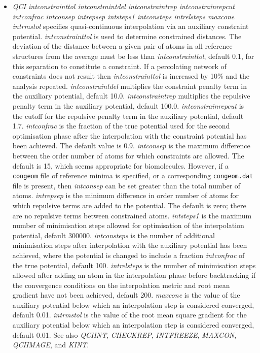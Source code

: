 \documentclass[12pt,a4paper,dvips]{article}
\begin{document}
\begin{itemize}
\item{\it QCI intconstrainttol intconstraintdel intconstraintrep intconstrainrepcut
intconfrac intconsep intrepsep intsteps1 intconsteps intrelsteps maxcone intrmstol\/}
specifies quasi-continuous interpolation via an auxiliary constraint potential.
{\it intconstrainttol\/} is used to determine constrained distances. The deviation
of the distance between a given pair of atoms
in all reference structures from the average must be less than
{\it intconstrainttol\/}, default 0.1, for this separation to constitute a constraint.
If a percolating network of constraints does not result then {\it intconstrainttol\/}
is increased by 10\% and the analysis repeated.
{\it intconstraintdel\/} multiplies the constraint penalty term in the auxiliary potential,
default 10.0.
{\it intconstraintrep\/} multiplies the repulsive penalty term in the auxiliary potential,
default 100.0.
{\it intconstrainrepcut\/} is the cutoff for the repulsive penalty term in the auxiliary potential,
default 1.7.
{\it intconfrac\/} is the fraction of the true potential used for the second optimisation
phase after the interpolation with the constraint potential has been achieved. The
default value is 0.9.
{\it intconsep\/} is the maximum difference between the order number of atoms for
which constraints are allowed. The default is 15, which seems appropriate for
biomolecules. However, if a {\tt congeom} file of reference minima is specified, or
a corresponding {\tt congeom.dat} file is present, then {\it intconsep\/} can be set
greater than the total number of atoms.
{\it intrepsep} is the minimum difference in order number of atoms for which repulsive
terms are added to the potential. The default is zero; there are no repulsive terms
between constrained atoms.
{\it intsteps1} is the maximum number of minimisation steps allowed for optimisation
of the interpolation potential, default 300000.
{\it intconsteps\/} is the number of additional minimisation steps after interpolation
with the auxiliary potential has been achieved, where the potential is changed to
include a fraction {\it intconfrac\/} of the true potential, default 100.
{\it intrelsteps\/} is the number of minimisation steps allowed after adding an atom
in the interpolation phase before backtracking if the convergence conditions on the
interpolation metric and root mean gradient have not been achieved, default 200.
{\it maxcone\/} is the value of the auxiliary potential below which an interpolation
step is considered converged, default 0.01.
{\it intrmstol\/} is the value of the root mean square gradient for
the auxiliary potential below which an interpolation
step is considered converged, default 0.01.
See also {\it QCIINT\/},
{\it CHECKREP\/},
{\it INTFREEZE\/},
{\it MAXCON\/},
{\it QCIIMAGE\/}, and
{\it KINT\/}.


\end{itemize}
\end{document}
